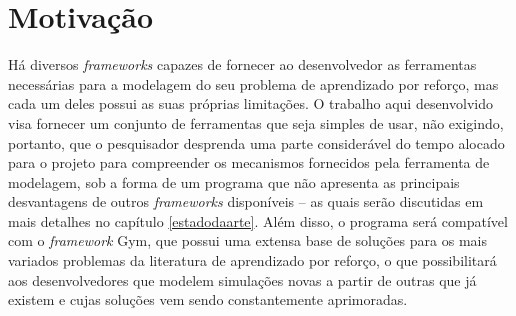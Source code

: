 \documentclass[cic,tc]{iiufrgs}
\newcommand\bruno[1]{\textcolor{magenta}{#1}}
\begin{document}
\section{Motivação}
Há diversos \textit{frameworks} capazes de fornecer ao desenvolvedor as ferramentas necessárias para a modelagem do seu problema de aprendizado por reforço,
mas cada um deles possui as suas próprias limitações. O trabalho aqui desenvolvido visa fornecer um conjunto de ferramentas que seja simples de usar, não
exigindo, portanto, que o pesquisador desprenda uma parte considerável do tempo alocado para o projeto para compreender os mecanismos fornecidos pela ferramenta
de modelagem, sob a forma de um programa que não apresenta as principais desvantagens de outros \textit{frameworks} disponíveis -- as quais serão discutidas
em mais detalhes no capítulo \ref{estadodaarte}. Além disso, o programa será compatível com o \textit{framework} Gym, que possui uma extensa base de soluções
para os mais variados problemas da literatura de aprendizado por reforço, o que possibilitará aos desenvolvedores que modelem simulações novas a partir de
outras que já existem e cujas soluções vem sendo constantemente aprimoradas.
%
\end{document}
